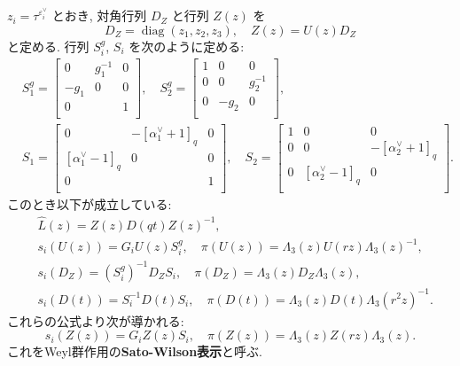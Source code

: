 \documentclass[12pt,twoside,dvipdfm]{msjproc}
\theoremstyle{definition} %
\theoremstyle{definition} %
\theoremstyle{definition} %
\numberwithin{theorem}{section}
\numberwithin{equation}{section}
\numberwithin{figure}{section}
\numberwithin{table}{section}
\newcommand\diag{\mathop{\mathrm{diag}}\nolimits}
\newcommand\hL{{\widehat{L}}}
\newcommand\ev{\varepsilon^\vee}
\newcommand\av{\alpha^\vee}
\begin{document}
$z_i=\tau^{\ev_i}$ とおき, 対角行列 $D_Z$ と行列 $Z(z)$ を
\begin{equation*}
  D_Z=\diag(z_1,z_2,z_3), \quad Z(z) = U(z)D_Z
\end{equation*} 
と定める. 行列 $S^g_i$, $S_i$ を次のように定める:
\begin{align*}
 &
 S^g_1 =
 \begin{bmatrix}
   0    & g_1^{-1} & 0 \\
   -g_1 & 0        & 0 \\
   0    &          & 1 \\
 \end{bmatrix},
 \quad
 S^g_2 =
 \begin{bmatrix}
   1 & 0 & 0 \\
   0 & 0 & g_2^{-1} \\
   0 & -g_2 & 0 \\
 \end{bmatrix},
 \\ &
 S_1 =
 \begin{bmatrix}
   0           & -[\av_1+1]_q & 0 \\
   [\av_1-1]_q & 0        & 0 \\
   0           &          & 1 \\
 \end{bmatrix},
 \quad
 S_2 =
 \begin{bmatrix}
   1 & 0           & 0 \\
   0 & 0           & -[\av_2+1]_q \\
   0 & [\av_2-1]_q & 0 \\
 \end{bmatrix}.
\end{align*}
このとき以下が成立している:
\begin{align*}
 &
 \hL(z) = Z(z)D(qt)Z(z)^{-1}, 
 \\ &
 s_i(U(z)) = G_i U(z) S^g_i,  \quad
 \pi(U(z)) = \Lambda_3(z)U(rz)\Lambda_3(z)^{-1}, 
 \\ &
 s_i(D_Z) = (S^g_i)^{-1} D_Z S_i, \quad
 \pi(D_Z) = \Lambda_3(z) D_Z \Lambda_3(z),
 \\ &
 s_i(D(t)) = S_i^{-1} D(t) S_i, \quad
 \pi(D(t)) = \Lambda_3(z)D(t)\Lambda_3(r^2z)^{-1}.
\end{align*}
これらの公式より次が導かれる:
\begin{equation*}
 s_i(Z(z)) = G_i Z(z) S_i, \quad
 \pi(Z(z)) = \Lambda_3(z) Z(rz) \Lambda_3(z).
\end{equation*}
これをWeyl群作用の{\bf Sato-Wilson表示}と呼ぶ.
\end{document}
